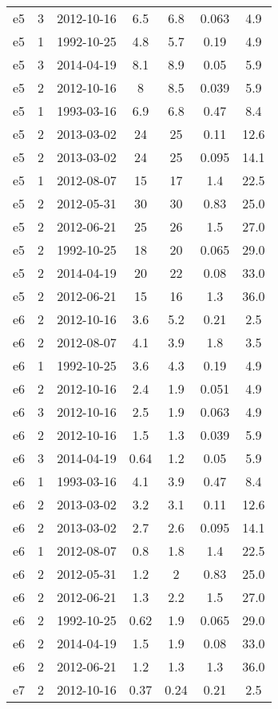 \begin{table*}[htp]
\begin{tabular}{ccccccc}
e5 & 3 & 2012-10-16 & 6.5 & 6.8 & 0.063 & 4.9 \\
e5 & 1 & 1992-10-25 & 4.8 & 5.7 & 0.19 & 4.9 \\
e5 & 3 & 2014-04-19 & 8.1 & 8.9 & 0.05 & 5.9 \\
e5 & 2 & 2012-10-16 & 8 & 8.5 & 0.039 & 5.9 \\
e5 & 1 & 1993-03-16 & 6.9 & 6.8 & 0.47 & 8.4 \\
e5 & 2 & 2013-03-02 & 24 & 25 & 0.11 & 12.6 \\
e5 & 2 & 2013-03-02 & 24 & 25 & 0.095 & 14.1 \\
e5 & 1 & 2012-08-07 & 15 & 17 & 1.4 & 22.5 \\
e5 & 2 & 2012-05-31 & 30 & 30 & 0.83 & 25.0 \\
e5 & 2 & 2012-06-21 & 25 & 26 & 1.5 & 27.0 \\
e5 & 2 & 1992-10-25 & 18 & 20 & 0.065 & 29.0 \\
e5 & 2 & 2014-04-19 & 20 & 22 & 0.08 & 33.0 \\
e5 & 2 & 2012-06-21 & 15 & 16 & 1.3 & 36.0 \\
e6 & 2 & 2012-10-16 & 3.6 & 5.2 & 0.21 & 2.5 \\
e6 & 2 & 2012-08-07 & 4.1 & 3.9 & 1.8 & 3.5 \\
e6 & 1 & 1992-10-25 & 3.6 & 4.3 & 0.19 & 4.9 \\
e6 & 2 & 2012-10-16 & 2.4 & 1.9 & 0.051 & 4.9 \\
e6 & 3 & 2012-10-16 & 2.5 & 1.9 & 0.063 & 4.9 \\
e6 & 2 & 2012-10-16 & 1.5 & 1.3 & 0.039 & 5.9 \\
e6 & 3 & 2014-04-19 & 0.64 & 1.2 & 0.05 & 5.9 \\
e6 & 1 & 1993-03-16 & 4.1 & 3.9 & 0.47 & 8.4 \\
e6 & 2 & 2013-03-02 & 3.2 & 3.1 & 0.11 & 12.6 \\
e6 & 2 & 2013-03-02 & 2.7 & 2.6 & 0.095 & 14.1 \\
e6 & 1 & 2012-08-07 & 0.8 & 1.8 & 1.4 & 22.5 \\
e6 & 2 & 2012-05-31 & 1.2 & 2 & 0.83 & 25.0 \\
e6 & 2 & 2012-06-21 & 1.3 & 2.2 & 1.5 & 27.0 \\
e6 & 2 & 1992-10-25 & 0.62 & 1.9 & 0.065 & 29.0 \\
e6 & 2 & 2014-04-19 & 1.5 & 1.9 & 0.08 & 33.0 \\
e6 & 2 & 2012-06-21 & 1.2 & 1.3 & 1.3 & 36.0 \\
e7 & 2 & 2012-10-16 & 0.37 & 0.24 & 0.21 & 2.5 \\

\end{tabular}
\end{table*}

